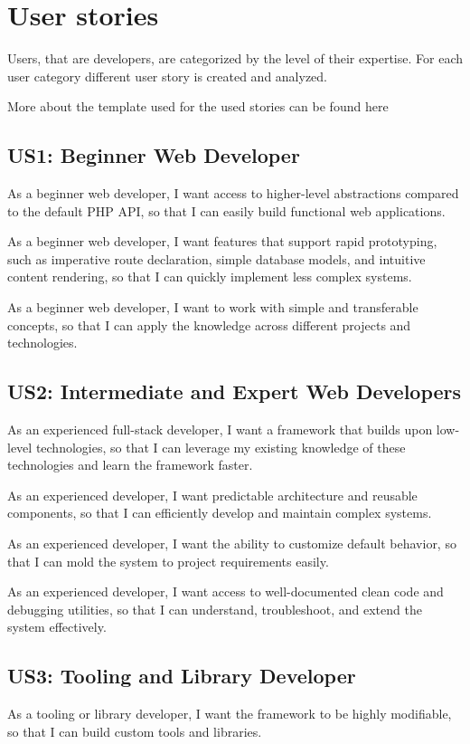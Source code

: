 \section{User stories}\label{sec:user-stories}
Users, that are developers, are categorized by the level of their expertise.
For each user category different user story is created and analyzed.

More about the template used for the used stories can be found here~\parencite[User story template and examples]{atlassian_user_stories}

\subsection*{US1: Beginner Web Developer}
As a beginner web developer,
I want access to higher-level abstractions compared to the default PHP API,
so that I can easily build functional web applications.

As a beginner web developer,
I want features that support rapid prototyping,
such as imperative route declaration, simple database models, and intuitive content rendering,
so that I can quickly implement less complex systems.

As a beginner web developer,
I want to work with simple and transferable concepts,
so that I can apply the knowledge across different projects and technologies.

\subsection*{US2: Intermediate and Expert Web Developers}
As an experienced full-stack developer,
I want a framework that builds upon low-level technologies,
so that I can leverage my existing knowledge of these technologies and learn the framework faster.

As an experienced developer,
I want predictable architecture and reusable components,
so that I can efficiently develop and maintain complex systems.

As an experienced developer,
I want the ability to customize default behavior,
so that I can mold the system to project requirements easily.

As an experienced developer,
I want access to well-documented clean code and debugging utilities,
so that I can understand, troubleshoot, and extend the system effectively.

\subsection*{US3: Tooling and Library Developer}
As a tooling or library developer,
I want the framework to be highly modifiable,
so that I can build custom tools and libraries.

